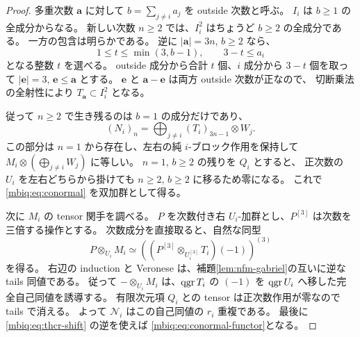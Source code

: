 \begin{proof}
多重次数 $\boldsymbol a$ に対して
$b=\sum_{j\ne i}a_j$ を outside 次数と呼ぶ。
$I_i$ は $b\geq1$ の全成分からなる。
新しい次数 $n\geq2$ では、$I_i^2$ はちょうど $b\geq2$ の全成分である。
一方の包含は明らかである。
逆に $|\boldsymbol a|=3n$, $b\geq2$ なら、
\[
 1\leq t\leq\min(3,b-1),\qquad 3-t\leq a_i
\]
となる整数 $t$ を選べる。
outside 成分から合計 $t$ 個、$i$ 成分から $3-t$ 個を取って
$|\boldsymbol e|=3$, $\boldsymbol e\leq\boldsymbol a$ とする。
$\boldsymbol e$ と $\boldsymbol a-\boldsymbol e$ は両方 outside 次数が正なので、
切断乗法の全射性により $T_{\boldsymbol a}\subset I_i^2$ となる。

従って $n\geq2$ で生き残るのは $b=1$ の成分だけであり、
\[
 (N_i)_n=\bigoplus_{j\ne i}(T_i)_{3n-1}\otimes W_j.
\]
この部分は $n=1$ から存在し、左右の純 $i$-ブロック作用を保持して
$M_i\otimes(\bigoplus_{j\ne i}W_j)$ に等しい。
$n=1$, $b\geq2$ の残りを $Q_i$ とすると、
正次数の $U_i$ を左右どちらから掛けても $n\geq2$, $b\geq2$ に移るため零になる。
これで \eqref{mbiq:eq:conormal} を双加群として得る。

次に $M_i$ の tensor 関手を調べる。
$P$ を次数付き右 $U_i$-加群とし、$P^{[3]}$ は次数を三倍する操作とする。
次数成分を直接取ると、自然な同型
\begin{equation}\label{mbiq:eq:veronese-root-tensor}
 P\otimes_{U_i}M_i
 \simeq
 \left(\left(P^{[3]}\otimes_{U_i^{[3]}}T_i\right)(-1)\right)^{(3)}
\end{equation}
を得る。
右辺の induction と Veronese は、補題\ref{lem:nfm-gabriel}の互いに逆な tails 同値である。
従って $-\otimes_{U_i}M_i$ は、$\operatorname{qgr} T_i$ の $(-1)$ を
$\operatorname{qgr} U_i$ へ移した完全自己同値を誘導する。
有限次元項 $Q_i$ との tensor は正次数作用が零なので tails で消える。
よって $\mathcal N_i$ はこの自己同値の $r_i$ 重複である。
最後に \eqref{mbiq:eq:thcr-shift} の逆を使えば
\eqref{mbiq:eq:conormal-functor}となる。
\end{proof}

